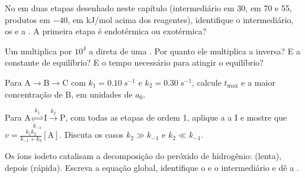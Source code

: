 \begin{exercise}[$\star$]\label{exo:b1:elementary-steps:3}
No  em duas etapas desenhado neste capítulo
(intermediário em 30,  em 70 e 55, produtos em
$-40$, em \unit{kJ/mol} acima dos reagentes), identifique o
intermediário, os  e a . A primeira etapa é endotérmica ou exotérmica?
\end{exercise}

\begin{exercise}[$\star$]\label{exo:b1:elementary-steps:4}
Um  multiplica por $10^4$ a  direta de
uma . Por quanto ele multiplica a 
inversa? E a constante de equilíbrio? E o tempo necessário para atingir
o equilíbrio?
\end{exercise}

\begin{exercise}[$\star\star$]\label{exo:b1:elementary-steps:5}
Para $\mathrm{A} \to \mathrm{B} \to \mathrm{C}$ com $k_1 =
\qty{0.10}{s^{-1}}$ e $k_2 = \qty{0.30}{s^{-1}}$, calcule $t_{\max}$ e a
maior concentração de $\mathrm{B}$, em unidades de $a_0$.
\end{exercise}

\begin{exercise}[$\star\star$]\label{exo:b1:elementary-steps:6}
Para $\mathrm{A} \underset{k_{-1}}{\overset{k_1}{\rightleftharpoons}}
\mathrm{I} \xrightarrow{k_2} \mathrm{P}$, com todas as etapas de ordem 1,
aplique a  a $\mathrm{I}$ e mostre que
$v =
\frac{k_1k_2}{k_{-1} + k_2}[\mathrm{A}]$. Discuta os casos $k_2 \gg
k_{-1}$ e $k_2 \ll k_{-1}$.
\end{exercise}

\begin{exercise}[$\star\star$]\label{exo:b1:elementary-steps:7}
Os íons iodeto catalisam a decomposição do peróxido de hidrogênio:
 (lenta), depois 
(rápida). Escreva a equação global, identifique o  e o
intermediário e dê a .
\end{exercise}

